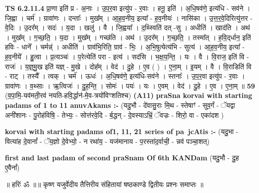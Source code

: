 \documentclass[17pt]{extarticle}
\begin{document}
                  \newline
                                \textbf{ TS 6.2.11.4} \newline
                  प्रा॒णा इति॑ प्र - अ॒नाः । उ॒प॒र॒वा इत्यु॑प - र॒वाः । हनू॒ इति॑ । अ॒धि॒षव॑णे॒ इत्य॑धि - सव॑ने । जि॒ह्वा । चर्म॑ । ग्रावा॑णः । दन्ताः᳚ । मुख᳚म् । आ॒ह॒व॒नीय॒ इत्या᳚ - ह॒व॒नीयः॑ । नासि॑का । उ॒त्त॒र॒वे॒दिरित्यु॑त्तर - वे॒दिः । उ॒दर᳚म् । सदः॑ । य॒दा । खलु॑ । वै । जि॒ह्वया᳚ । द॒थ्स्विति॑ दत् -सु । अधीति॑ । खाद॑ति । अथ॑ । मुख᳚म् । ग॒च्छ॒ति॒ । य॒दा । मुख᳚म् । गच्छ॑ति । अथ॑ । उ॒दर᳚म् । ग॒च्छ॒ति॒ । तस्मा᳚त् । ह॒वि॒द्‌र्धान॒ इति॑ हविः - धाने᳚ । चर्मन्न्॑ । अधीति॑ । ग्राव॑भि॒रिति॒ ग्राव॑ - भिः॒ । अ॒भि॒षुत्येत्य॑भि - सुत्य॑ । आ॒ह॒व॒नीय॒ इत्या᳚ - ह॒व॒नीये᳚ । हु॒त्वा । प्र॒त्यञ्चः॑ । प॒रेत्येति॑ परा - इत्य॑ । सद॑सि । भ॒क्ष॒य॒न्ति॒ । यः । वै । वि॒राज॒ इति॑ वि - राजः॑ । य॒ज्ञ्॒मु॒ख इति॑ यज्ञ् - मु॒खे । दोह᳚म् । वेद॑ । दु॒हे । ए॒व ( ) । ए॒ना॒म् । इ॒यम् । वै । वि॒राडिति॑ वि - राट् । तस्यै᳚ । त्वक् । चर्म॑ । ऊधः॑ । अ॒धि॒षव॑णे॒ इत्य॑धि-सव॑ने । स्तनाः᳚ । उ॒प॒र॒वा इत्यु॑प - र॒वाः । ग्रावा॑णः । व॒थ्साः । ऋ॒त्विजः॑ । दु॒ह॒न्ति॒ । सोमः॑ । पयः॑ । यः । ए॒वम् । वेद॑ । दु॒हे । ए॒व । ए॒ना॒म् ॥ \textbf{  59} \newline
                  \newline
                      (व॒पा॒मि॒-यव॑मती॒रव॑ नयति-हवि॒र्द्धान॑-मे॒व-त्रयो॑विꣳशतिश्च)  \textbf{(A11)} \newline \newline
\textbf{praSna korvai with starting padams of 1 to 11 anuvAkams :-} \newline
(यदु॒भौ - दे॑वासु॒राः मि॒थ - स्तेषाꣳ॑ - सुव॒र्गं - ॅयद्वा अनी॑शानः - पु॒रोह॑विषि॒ - तेभ्यः॒ - सोत्त॑रवे॒दि - र्ब॒द्धन् - दे॒वस्याऽभ्रिं॒ ॅवज्रः - शिरो॒ वा - एका॑दश ) \newline

\textbf{korvai with starting padams of1, 11, 21 series of pa~jcAtis :-} \newline
(यदु॒भा - वित्या॑ह दे॒वानां᳚ - ॅय॒ज्ञो दे॒वेभ्यो॒ - न रथा॑य॒ - यज॑मानाय - प॒रस्ता॑द॒र्वाची॒ - न्नव॑ पञ्चा॒शत्) \newline

\textbf{first and last padam of second praSnam Of 6th KANDam} \newline
(यदु॒भौ - दु॒ह ए॒वैनां᳚) \newline 


॥ हरिः॑ ॐ ॥॥ कृष्ण यजुर्वेदीय तैत्तिरीय संहितायां षष्ठकाण्डे द्वितीयः प्रश्नः समाप्तः ॥ \newline
\pagebreak
\pagebreak
        
\end{document}
